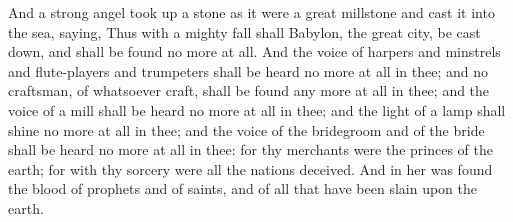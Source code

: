  And a strong angel took up a stone as it were a great millstone and cast it into the sea, saying, Thus with a mighty fall shall Babylon, the great city, be cast down, and shall be found no more at all. 
 And the voice of harpers and minstrels and flute-players and trumpeters shall be heard no more at all in thee; and no craftsman, of whatsoever craft, shall be found any more at all in thee; and the voice of a mill shall be heard no more at all in thee; 
 and the light of a lamp shall shine no more at all in thee; and the voice of the bridegroom and of the bride shall be heard no more at all in thee: for thy merchants were the princes of the earth; for with thy sorcery were all the nations deceived. 
 And in her was found the blood of prophets and of saints, and of all that have been slain upon the earth.